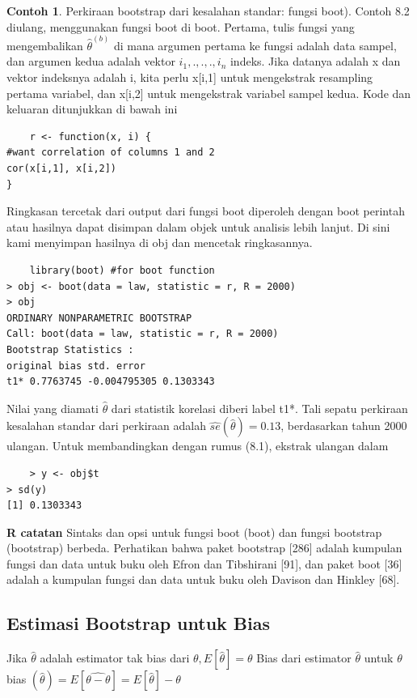 \documentclass[a4paper,12pt]{article}
\theoremstyle{definition}
\newtheorem{example}{Contoh}[section]
\begin{document}
\begin{example}
    Perkiraan bootstrap dari kesalahan standar: fungsi boot). Contoh 8.2 diulang, menggunakan fungsi boot di boot. Pertama, tulis fungsi
yang mengembalikan $\widehat{\theta }^{(b)}$ di mana argumen pertama ke fungsi adalah data sampel,
dan argumen kedua adalah vektor ${i_{1},.,.,.,i_{n}}$ indeks. Jika datanya adalah x dan vektor indeksnya adalah i, kita perlu x[i,1] untuk mengekstrak resampling pertama variabel, dan x[i,2] untuk mengekstrak variabel sampel kedua. Kode dan keluaran ditunjukkan di bawah ini
\begin{lstlisting}
    r <- function(x, i) {
#want correlation of columns 1 and 2
cor(x[i,1], x[i,2])
}
\end{lstlisting}
Ringkasan tercetak dari output dari fungsi boot diperoleh dengan boot perintah atau hasilnya dapat disimpan dalam objek untuk analisis lebih lanjut. Di sini kami menyimpan hasilnya di obj dan mencetak ringkasannya.
\begin{lstlisting}
    library(boot) #for boot function
> obj <- boot(data = law, statistic = r, R = 2000)
> obj
ORDINARY NONPARAMETRIC BOOTSTRAP
Call: boot(data = law, statistic = r, R = 2000)
Bootstrap Statistics :
original bias std. error
t1* 0.7763745 -0.004795305 0.1303343
\end{lstlisting}
Nilai yang diamati $\widehat{\theta }$ dari statistik korelasi diberi label t1*. Tali sepatu perkiraan kesalahan standar dari perkiraan adalah $\widehat{se}(\widehat{\theta })=0.13$, berdasarkan tahun 2000
ulangan. Untuk membandingkan dengan rumus (8.1), ekstrak ulangan dalam 
\begin{lstlisting}
    > y <- obj$t
> sd(y)
[1] 0.1303343
\end{lstlisting}
\end{example}
\textbf{ R catatan}
Sintaks dan opsi untuk fungsi boot (boot) dan fungsi bootstrap (bootstrap) berbeda. Perhatikan bahwa paket bootstrap [286] adalah kumpulan fungsi dan data untuk buku oleh Efron dan Tibshirani [91], dan paket boot [36] adalah a kumpulan fungsi dan data untuk buku oleh Davison dan Hinkley
[68].
\subsection{Estimasi Bootstrap untuk Bias}
Jika $\hat{\theta}$ adalah estimator tak bias dari $\theta , E\left [ \hat{\theta } \right ]=\theta $ Bias dari estimator $\hat{\theta }$ untuk $\theta $ bias $\left ( \hat{\theta } \right ) = E\left [ \hat{\theta -\theta } \right ]=E\left [ \hat{\theta } \right ]-\theta $
\end{document}
